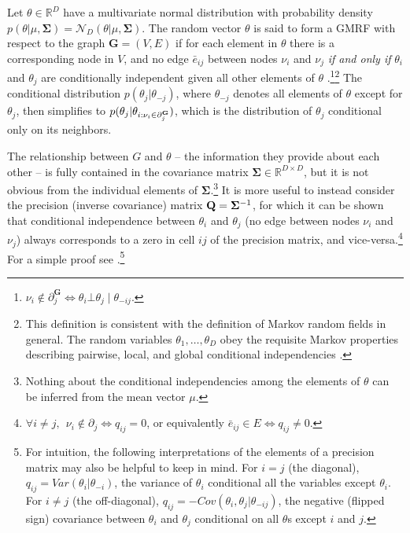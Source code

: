 Let $\theta \in \mathbb{R}^D$ have a multivariate normal distribution with probability 
density $p(\theta | \mu, \boldsymbol{\Sigma}) = \mathcal{N}_D (\theta | \mu, \boldsymbol{\Sigma})$. 
The random vector $\theta$ is said to form a GMRF with respect to the graph $\mathbf{G} = (V,E)$ if 
for each element in $\theta$ there is a corresponding node in $V$, and no edge $\bar{e}_{ij}$ between 
nodes $\nu_i$ and $\nu_j$ \emph{if and only if} $\theta_i$ and $\theta_j$ are conditionally independent 
given all other elements of $\theta$ .\footnote{$\nu_i \notin 
\partial^\mathbf{G}_{j} \iff \theta_i \bot \theta_j \mid \theta_{-ij}.$}\footnote{This definition is consistent 
with the definition of Markov random fields in general. The random variables $\theta_1, \dots, \theta_D$ 
obey the requisite Markov properties describing pairwise, local, and global conditional independencies .} The conditional distribution $p(\theta_j | \theta_{-j})$, where $\theta_{-j}$
denotes all elements of $\theta$ except for $\theta_j$, then simplifies to  $p(\theta_j |  \theta_{i : \nu_i \in \partial^{\mathbf{G}}_j})$, which is the distribution of $\theta_j$ conditional only on its neighbors. 

The relationship between $G$ and $\theta$ -- the information they provide about each other -- is fully 
contained in the covariance matrix $\boldsymbol{\Sigma} \in \mathbb{R}^{D\times D}$, but it is not 
obvious from the individual elements of $\boldsymbol{\Sigma}$.\footnote{Nothing about the conditional 
independencies among the elements of $\theta$ can be inferred from the mean vector $\mu$.} It is 
more useful to instead consider the precision (inverse covariance) matrix 
$\mathbf{Q} =\boldsymbol{\Sigma}^{-1}$, for which it can be shown that conditional independence between 
$\theta_i$ and $\theta_j$ (no edge between nodes $\nu_i$ and $\nu_j$) always corresponds to a zero in 
cell $ij$ of the precision matrix, and vice-versa.\footnote{
$\forall i \neq j, \:\: \nu_i \notin \partial_j \iff q_{ij} = 0$, or equivalently $\bar{e}_{ij} \in E \iff q_{ij} \neq 0$.}  
For a simple proof see .\footnote{For intuition, the following interpretations of 
the elements of a precision matrix may also be helpful to keep in mind. For $i = j$ (the diagonal),  
$q_{ij} = Var(\theta_i | \theta_{-i})$, the variance of $\theta_i$ conditional all the variables except 
$\theta_i$. For $i \neq j$ (the off-diagonal), $q_{ij}  = -Cov(\theta_i, \theta_j | \theta_{-ij}) $, the negative 
(flipped sign) covariance between $\theta_i$ and $\theta_j$ conditional on all $\theta$s except $i$ and $j$.}


